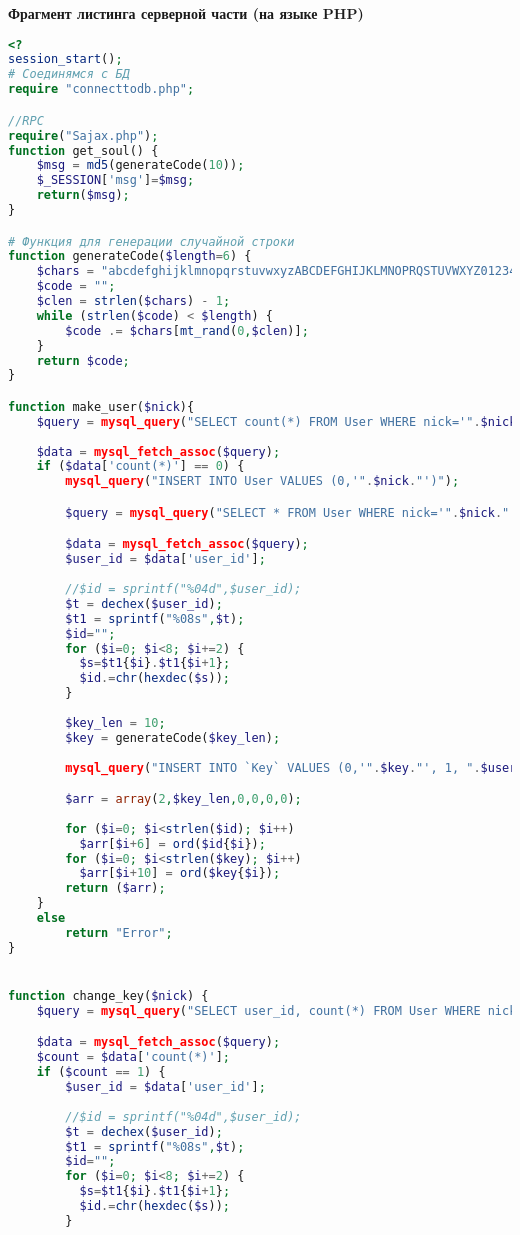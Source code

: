 \textbf{Фрагмент листинга серверной части (на языке PHP)}
{\small
\begin{lstlisting}[language=PHP]
<? 
session_start();
# Соединямся с БД
require "connecttodb.php"; 

//RPC
require("Sajax.php");
function get_soul() {
	$msg = md5(generateCode(10)); 
	$_SESSION['msg']=$msg; 
	return($msg);
}

# Функция для генерации случайной строки 
function generateCode($length=6) { 
    $chars = "abcdefghijklmnopqrstuvwxyzABCDEFGHIJKLMNOPRQSTUVWXYZ0123456789"; 
    $code = ""; 
    $clen = strlen($chars) - 1;   
    while (strlen($code) < $length) { 
        $code .= $chars[mt_rand(0,$clen)];   
    } 
    return $code; 
} 

function make_user($nick){
	$query = mysql_query("SELECT count(*) FROM User WHERE nick='".$nick."' LIMIT 1");
	
	$data = mysql_fetch_assoc($query); 
	if ($data['count(*)'] == 0) {
	    mysql_query("INSERT INTO User VALUES (0,'".$nick."')");

		$query = mysql_query("SELECT * FROM User WHERE nick='".$nick."' LIMIT 1");

		$data = mysql_fetch_assoc($query); 
		$user_id = $data['user_id'];
		
		//$id = sprintf("%04d",$user_id);
		$t = dechex($user_id);
		$t1 = sprintf("%08s",$t);
		$id="";
		for ($i=0; $i<8; $i+=2) {
		  $s=$t1{$i}.$t1{$i+1};
		  $id.=chr(hexdec($s));
		}
		
		$key_len = 10;
		$key = generateCode($key_len);
		
		mysql_query("INSERT INTO `Key` VALUES (0,'".$key."', 1, ".$user_id.")");

		$arr = array(2,$key_len,0,0,0,0);
		
		for ($i=0; $i<strlen($id); $i++)
		  $arr[$i+6] = ord($id{$i});
		for ($i=0; $i<strlen($key); $i++)
		  $arr[$i+10] = ord($key{$i});
		return ($arr);
	}
	else 
		return "Error";
}


function change_key($nick) {
	$query = mysql_query("SELECT user_id, count(*) FROM User WHERE nick='".$nick."'	LIMIT 1");

	$data = mysql_fetch_assoc($query);
	$count = $data['count(*)'];
	if ($count == 1) {
		$user_id = $data['user_id'];
		
		//$id = sprintf("%04d",$user_id);
		$t = dechex($user_id);
		$t1 = sprintf("%08s",$t);
		$id="";
		for ($i=0; $i<8; $i+=2) {
		  $s=$t1{$i}.$t1{$i+1};
		  $id.=chr(hexdec($s));
		}
		

\end{lstlisting}}
